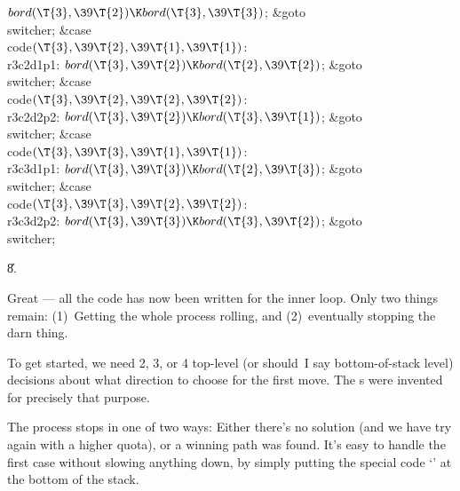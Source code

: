 ${}\\{bord}(\T{3},\39\T{2})\K\\{bord}(\T{3},\39\T{3}){}$;\5
\&{goto} \\{switcher};\6
\4\&{case} \\{code}${}(\T{3},\39\T{2},\39\T{1},\39\T{1}){}$:\5
\\{r3c2d1p1}:\5
${}\\{bord}(\T{3},\39\T{2})\K\\{bord}(\T{2},\39\T{2}){}$;\5
\&{goto} \\{switcher};\6
\4\&{case} \\{code}${}(\T{3},\39\T{2},\39\T{2},\39\T{2}){}$:\5
\\{r3c2d2p2}:\5
${}\\{bord}(\T{3},\39\T{2})\K\\{bord}(\T{3},\39\T{1}){}$;\5
\&{goto} \\{switcher};\6
\4\&{case} \\{code}${}(\T{3},\39\T{3},\39\T{1},\39\T{1}){}$:\5
\\{r3c3d1p1}:\5
${}\\{bord}(\T{3},\39\T{3})\K\\{bord}(\T{2},\39\T{3}){}$;\5
\&{goto} \\{switcher};\6
\4\&{case} \\{code}${}(\T{3},\39\T{3},\39\T{2},\39\T{2}){}$:\5
\\{r3c3d2p2}:\5
${}\\{bord}(\T{3},\39\T{3})\K\\{bord}(\T{3},\39\T{2}){}$;\5
\&{goto} \\{switcher};\par
\U8.\fi

Great --- all the code has now been written for the inner loop.
Only two things remain: (1)~Getting the whole process rolling, and
(2)~eventually stopping the darn thing.

To get started, we need 2, 3, or 4 top-level (or should~I say
bottom-of-stack level) decisions about what direction to choose for the
first move. The s were invented for precisely that purpose.

The process stops in one of two ways: Either there's no solution
(and we have try again with a higher quota), or a winning path was
found. It's easy to handle the first case without slowing anything
down, by simply putting the special code `' at the bottom of the
stack.

